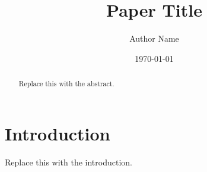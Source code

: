 \documentclass[11pt,a4paper]{article}
\title{Paper Title}
\author{Author Name}
\date{\today}
\begin{document}
\maketitle

\begin{abstract}
Replace this with the abstract.
\end{abstract}

\tableofcontents

\section{Introduction}
Replace this with the introduction.

% 
% 
\end{document}
